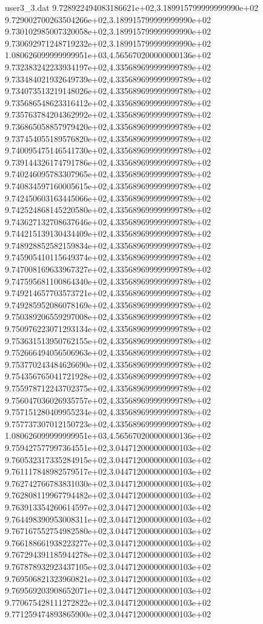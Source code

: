 \begin{filecontents}{user3_3.dat}
9.728922494083186621e+02,3.189915799999999990e+02
9.729002700263504266e+02,3.189915799999999990e+02
9.730102985007320058e+02,3.189915799999999990e+02
9.730692971248719232e+02,3.189915799999999990e+02
1.080626099999999951e+03,4.565670200000000136e+02
9.732383242233934197e+02,4.335689699999999789e+02
9.733484021932649739e+02,4.335689699999999789e+02
9.734073513219148026e+02,4.335689699999999789e+02
9.735686548623316412e+02,4.335689699999999789e+02
9.735763784204362992e+02,4.335689699999999789e+02
9.736865058857979420e+02,4.335689699999999789e+02
9.737454055189576820e+02,4.335689699999999789e+02
9.740095475146541730e+02,4.335689699999999789e+02
9.739144326174791786e+02,4.335689699999999789e+02
9.740246095783307965e+02,4.335689699999999789e+02
9.740834597160005615e+02,4.335689699999999789e+02
9.742450603163445066e+02,4.335689699999999789e+02
9.742524868145220580e+02,4.335689699999999789e+02
9.743627132708637646e+02,4.335689699999999789e+02
9.744215139130434409e+02,4.335689699999999789e+02
9.748928852582159834e+02,4.335689699999999789e+02
9.745905410115649374e+02,4.335689699999999789e+02
9.747008169633967327e+02,4.335689699999999789e+02
9.747595681100864340e+02,4.335689699999999789e+02
9.749214657703573721e+02,4.335689699999999789e+02
9.749285952086078169e+02,4.335689699999999789e+02
9.750389206559297008e+02,4.335689699999999789e+02
9.750976223071293134e+02,4.335689699999999789e+02
9.753631513950762155e+02,4.335689699999999789e+02
9.752666494056506963e+02,4.335689699999999789e+02
9.753770243484626690e+02,4.335689699999999789e+02
9.754356765041721928e+02,4.335689699999999789e+02
9.755978712243702375e+02,4.335689699999999789e+02
9.756047036026935757e+02,4.335689699999999789e+02
9.757151280409955234e+02,4.335689699999999789e+02
9.757737307012150723e+02,4.335689699999999789e+02
1.080626099999999951e+03,4.565670200000000136e+02
9.759427577997364551e+02,3.044712000000000103e+02
9.760532317335284915e+02,3.044712000000000103e+02
9.761117848982579517e+02,3.044712000000000103e+02
9.762742766783831030e+02,3.044712000000000103e+02
9.762808119967794482e+02,3.044712000000000103e+02
9.763913354260614597e+02,3.044712000000000103e+02
9.764498390953008311e+02,3.044712000000000103e+02
9.767167552754982580e+02,3.044712000000000103e+02
9.766188661938223277e+02,3.044712000000000103e+02
9.767294391185944278e+02,3.044712000000000103e+02
9.767878932923437105e+02,3.044712000000000103e+02
9.769506821323960821e+02,3.044712000000000103e+02
9.769569203908652071e+02,3.044712000000000103e+02
9.770675428111272822e+02,3.044712000000000103e+02
9.771259474893865900e+02,3.044712000000000103e+02

\end{filecontents}

